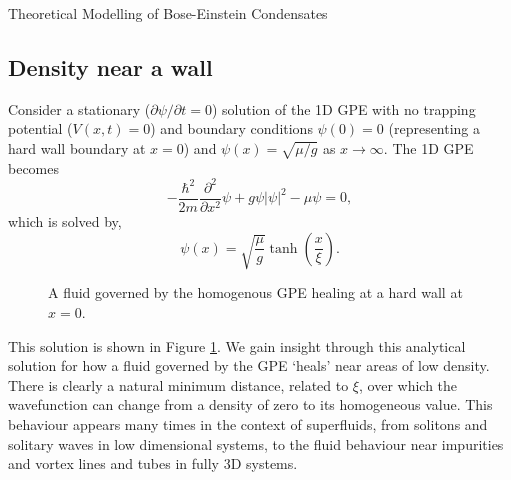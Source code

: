 \begin{chapter}{\label{cha:theoretical_model}Theoretical Modelling of Bose-Einstein Condensates}
	\subsection{\label{section:wall} Density near a wall}
	Consider a stationary ($\partial \psi / \partial t = 0$) solution of the 1D GPE with no trapping potential ($V(x,t)=0$) and boundary conditions $\psi(0)=0$ (representing a hard wall boundary at $x=0$) and $\psi(x)=\sqrt{\mu/g}$ as $x\rightarrow\infty$. The 1D GPE becomes
	\begin{equation}
		-\frac{\hbar^2 }{2m}\frac{\partial^2}{\partial x^2}\psi + g\psi|\psi|^2 - \mu\psi = 0,
	\end{equation}
	which is solved by,
	\begin{equation}
		\psi(x) = \sqrt{\frac{\mu}{g}}\tanh \left( \frac{x}{\xi} \right).
	\end{equation}
	\begin{figure}[!ht]
	\centering
  \caption{A fluid governed by the homogenous GPE healing at a hard wall at $x=0$.}\label{fig_wallsoln}
 \end{figure}
	This solution is shown in Figure \ref{fig_wallsoln}. We gain insight through this analytical solution for how a fluid governed by the GPE `heals' near areas of low density. There is clearly a natural minimum distance, related to $\xi$, over which the wavefunction can change from a density of zero to its homogeneous value. This behaviour appears many times in the context of superfluids, from solitons and solitary waves in low dimensional systems, to the fluid behaviour near impurities and vortex lines and tubes in fully 3D systems. 


\end{chapter}
